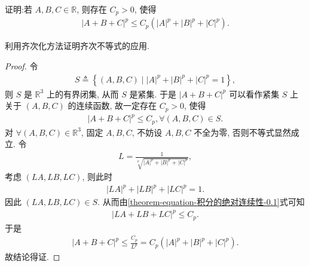 \documentclass[../../main.tex]{subfiles}
\begin{document}
\begin{lemma}\label{lemma:齐次化方法应用(三元p次方)}
证明:若 $A,B,C\in \mathbb{R}$, 则存在 $C_p>0$, 使得
\begin{align*}
|A + B + C|^p \leqslant C_p(|A|^p + |B|^p + |C|^p).
\end{align*}
\end{lemma}
\begin{note}
利用齐次化方法证明齐次不等式的应用.
\end{note}
\begin{proof}
令
\begin{align*}
S \triangleq \left\{ (A,B,C) \mid |A|^p + |B|^p + |C|^p = 1 \right\},
\end{align*}
则 $S$ 是 $\mathbb{R}^3$ 上的有界闭集, 从而 $S$ 是紧集. 于是 $|A + B + C|^p$ 可以看作紧集 $S$ 上关于 $(A,B,C)$ 的连续函数, 故一定存在 $C_p > 0$, 使得
\begin{align}
|A + B + C|^p \leqslant C_p, \forall (A,B,C) \in S. \label{theorem-equation-积分的绝对连续性-0.1}
\end{align}
对 $\forall (A,B,C) \in \mathbb{R}^3$, 固定 $A,B,C$, 不妨设 $A,B,C$ 不全为零, 否则不等式显然成立. 令
\begin{align*}
L = \frac{1}{\sqrt[p]{|A|^p + |B|^p + |C|^p}},
\end{align*}
考虑 $(LA,LB,LC)$, 则此时
\begin{align*}
|LA|^p + |LB|^p + |LC|^p = 1.
\end{align*}
因此 $(LA,LB,LC) \in S$. 从而由\eqref{theorem-equation-积分的绝对连续性-0.1}式可知
\begin{align*}
|LA + LB + LC|^p \leqslant C_p.
\end{align*}
于是
\begin{align*}
|A + B + C|^p \leqslant \frac{C_p}{L^p} = C_p(|A|^p + |B|^p + |C|^p).
\end{align*}
故结论得证. 

\end{proof}
\end{document}
